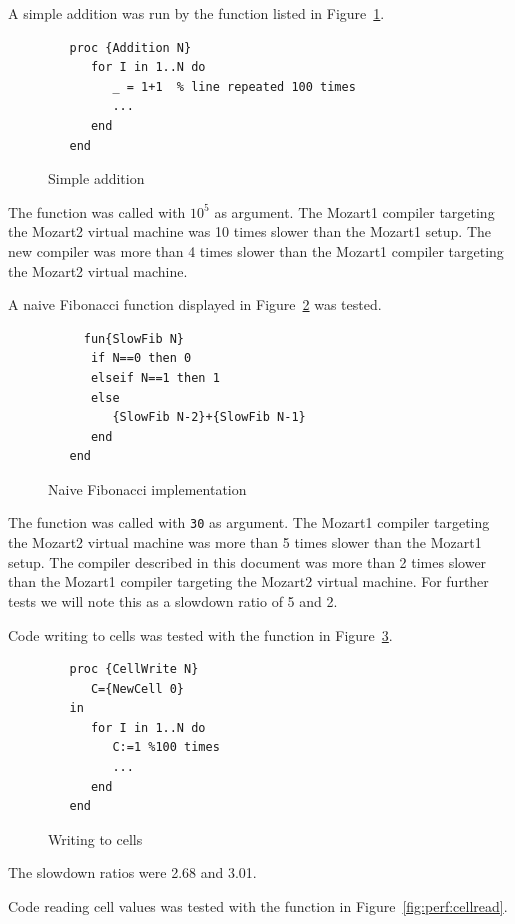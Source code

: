 \documentclass[a4paper]{memoir}
\begin{document}
A simple addition was run by the function listed in Figure~\ref{fig:perf:add}.

\begin{figure}[h]
\begin{lstlisting}
   proc {Addition N}
      for I in 1..N do
         _ = 1+1  % line repeated 100 times
         ...
      end
   end
\end{lstlisting}
\caption{Simple addition}
\label{fig:perf:add}
\end{figure}

The function was called with $10^5$ as argument.
The Mozart1 compiler targeting the Mozart2 virtual machine was 10 times slower
than the Mozart1 setup. The new compiler was more than 4 times slower than the
Mozart1 compiler targeting the Mozart2 virtual machine.




A naive Fibonacci function displayed in
Figure~\ref{fig:perf:fib} was tested.

\begin{figure}[h]
\begin{lstlisting}
     fun{SlowFib N}
      if N==0 then 0
      elseif N==1 then 1
      else
         {SlowFib N-2}+{SlowFib N-1}
      end
   end
\end{lstlisting}
\caption{Naive Fibonacci implementation}
\label{fig:perf:fib}
\end{figure}

The function was called with \lstinline!30! as argument.
The Mozart1 compiler targeting the Mozart2 virtual machine was more than 5 times slower
than the Mozart1 setup. The compiler described in this document was more than 2 times slower than the
Mozart1 compiler targeting the Mozart2 virtual machine. For further tests we
will note this as a slowdown ratio of 5 and 2.

Code writing to cells was tested with the function in Figure~\ref{fig:perf:cellwrite}.

\begin{figure}[h]
\begin{lstlisting}
   proc {CellWrite N}
      C={NewCell 0}
   in
      for I in 1..N do
         C:=1 %100 times
         ...
      end
   end
\end{lstlisting}
\caption{Writing to cells}
\label{fig:perf:cellwrite}
\end{figure}

The slowdown ratios were 2.68 and 3.01.

Code reading cell values was tested with the function in Figure~\ref{fig:perf:cellread}.
\end{document}
